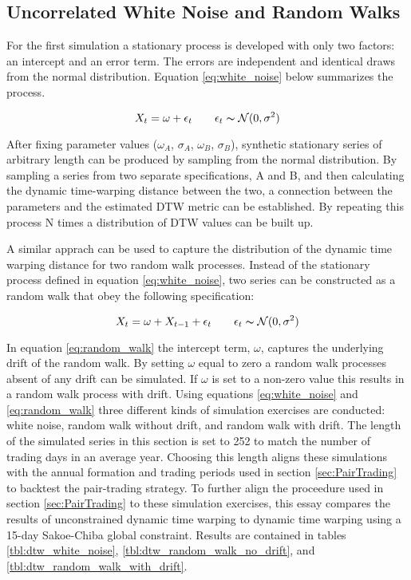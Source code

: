 \documentclass[12pt]{article}
\begin{document}
\subsection{Uncorrelated White Noise and Random Walks} \label{sec:Uncorrelated_white_noise}

For the first simulation a stationary process is developed with only two factors: an intercept and an error term. The errors are independent and identical draws from the normal distribution. Equation \ref{eq:white_noise} below summarizes the process.

\begin{equation} \label{eq:white_noise}
    X_{t} = \omega + \epsilon_{t} \qquad \epsilon_{t} \thicksim \mathcal{N}(0, \sigma^{2})
\end{equation}

After fixing parameter values ($\omega_{A}$, $\sigma_{A}$, $\omega_{B}$, $\sigma_{B}$), synthetic stationary series of arbitrary length can be produced by sampling from the normal distribution. By sampling a series from two separate specifications, A and B, and then calculating the dynamic time-warping distance between the two, a connection between the parameters and the estimated DTW metric can be established. By repeating this process N times a distribution of DTW values can be built up.

A similar apprach can be used to capture the distribution of the dynamic time warping distance for two random walk processes. Instead of the stationary process defined in equation \ref{eq:white_noise}, two series can be constructed as a random walk that obey the following specification:

\begin{equation} \label{eq:random_walk}
    X_{t} = \omega + X_{t-1} + \epsilon_{t} \qquad \epsilon_{t} \thicksim \mathcal{N}(0, \sigma^{2})
\end{equation}

In equation \ref{eq:random_walk} the intercept term, $\omega$, captures the underlying drift of the random walk. By setting $\omega$ equal to zero a random walk processes absent of any drift can be simulated. If $\omega$ is set to a non-zero value this results in a random walk process with drift. Using equations \ref{eq:white_noise} and \ref{eq:random_walk} three different kinds of simulation exercises are conducted: white noise, random walk without drift, and random walk with drift. The length of the simulated series in this section is set to 252 to match the number of trading days in an average year. Choosing this length aligns these simulations with the annual formation and trading periods used in section \ref{sec:PairTrading} to backtest the pair-trading strategy. To further align the proceedure used in section \ref{sec:PairTrading} to these simulation exercises, this essay compares the results of unconstrained dynamic time warping to dynamic time warping using a 15-day Sakoe-Chiba global constraint. Results are contained in tables \ref{tbl:dtw_white_noise}, \ref{tbl:dtw_random_walk_no_drift}, and \ref{tbl:dtw_random_walk_with_drift}.
\end{document}
